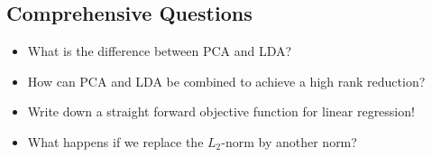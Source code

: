 \subsection{Comprehensive Questions}
	\begin{itemize}
		\item What is the difference between PCA and LDA? 
		\item How can PCA and LDA be combined to achieve a high rank reduction? 
		\item Write down a straight forward objective function for linear regression! 
		\item What happens if we replace the $L_2$-norm by another norm?
	\end{itemize}
	

